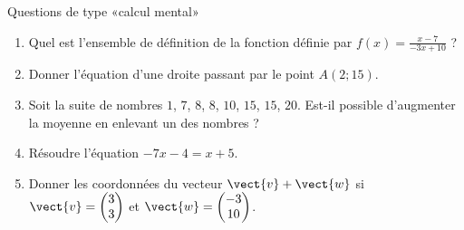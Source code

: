 
\begin{exercice}\label{exosmath-0718}

    Questions de type «calcul mental» 
    \begin{multicols}{2}
    \begin{enumerate}
        \item
            Quel est l'ensemble de définition de la fonction définie par \( f(x)=\frac{ x-7 }{ -3x+10 }\) ?
        \item
            Donner l'équation d'une droite passant par le point \( A(2;15)\).
        \item
            Soit la suite de nombres \( 1\), \( 7\), \( 8\), \( 8\), \( 10\), \( 15\), \( 15\), \( 20\). Est-il possible d'augmenter la moyenne en enlevant un des nombres ?
        \item
            Résoudre l'équation \( -7x-4=x+5\).
        \item
            Donner les coordonnées du vecteur \( \vect{ v }+\vect{ w }\) si \( \vect{ v }=\begin{pmatrix}
                3    \\ 
                3    
            \end{pmatrix}\) et \( \vect{ w }=\begin{pmatrix}
                -3    \\ 
                10    
            \end{pmatrix}\).
    \end{enumerate}
    \end{multicols}


\end{exercice}
